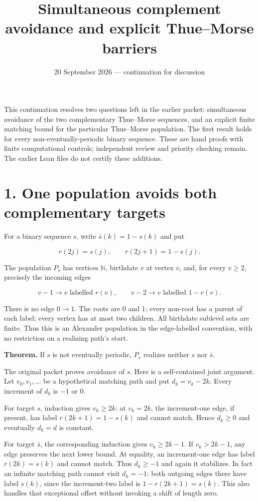 \documentclass[
  11pt,
]{article}
\title{Simultaneous complement avoidance and explicit Thue--Morse
barriers}
\author{}
\date{20 September 2026 --- continuation for discussion}
\begin{document}
\maketitle

This continuation resolves two questions left in the earlier packet:
simultaneous avoidance of the two complementary Thue--Morse sequences,
and an explicit finite matching bound for the particular Thue--Morse
population. The first result holds for every non-eventually-periodic
binary sequence. These are hand proofs with finite computational
controls; independent review and priority checking remain. The earlier
Lean files do not certify these additions.

\section{1. One population avoids both complementary
targets}\label{one-population-avoids-both-complementary-targets}

For a binary sequence \(s\), write \(\bar s(k)=1-s(k)\) and put

\[r(2j)=s(j),\qquad r(2j+1)=1-s(j).\]

The population \(P_s\) has vertices \(\mathbb N\), birthdate \(v\) at
vertex \(v\), and, for every \(v\ge2\), precisely the incoming edges

\[v-1\longrightarrow v\text{ labelled }r(v),\qquad
v-2\longrightarrow v\text{ labelled }1-r(v).\]

There is no edge \(0\to1\). The roots are 0 and 1; every non-root has a
parent of each label; every vertex has at most two children. All
birthdate sublevel sets are finite. Thus this is an Alexander population
in the edge-labelled convention, with no restriction on a realizing
path's start.

\textbf{Theorem.} If \(s\) is not eventually periodic, \(P_s\) realizes
neither \(s\) nor \(\bar s\).

The original packet proves avoidance of \(s\). Here is a self-contained
joint argument. Let \(v_0,v_1,\ldots\) be a hypothetical matching path
and put \(d_k=v_k-2k\). Every increment of \(d_k\) is \(-1\) or 0.

For target \(s\), induction gives \(v_k\ge2k\): at \(v_k=2k\), the
increment-one edge, if present, has label \(r(2k+1)=1-s(k)\) and cannot
match. Hence \(d_k\ge0\) and eventually \(d_k=d\) is constant.

For target \(\bar s\), the corresponding induction gives \(v_k\ge2k-1\).
If \(v_k>2k-1\), any edge preserves the next lower bound. At equality,
an increment-one edge has label \(r(2k)=s(k)\) and cannot match. Thus
\(d_k\ge-1\) and again it stabilizes. In fact an infinite matching path
cannot visit \(d_k=-1\): both outgoing edges there have label \(s(k)\),
since the increment-two label is \(1-r(2k+1)=s(k)\). This also handles
that exceptional offset without invoking a shift of length zero.
\end{document}
